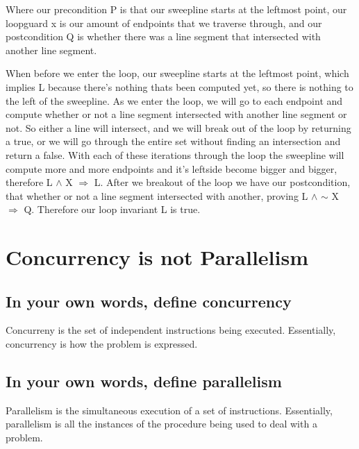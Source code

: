 \documentclass[10pt,a4paper]{article}
\begin{document}
Where our precondition P is that our sweepline starts at the leftmost point, our loopguard x is our amount of endpoints that we traverse through, and our postcondition Q is whether there was a line segment that intersected with another line segment.

When before we enter the loop, our sweepline starts at the leftmost point, which implies L because there's nothing thats been computed yet, so there is nothing to the left of the sweepline. As we enter the loop, we will go to each endpoint and compute whether or not a line segment intersected with another line segment or not. So either a line will intersect, and we will break out of the loop by returning a true, or we will go through the entire set without finding an intersection and return a false. With each of these iterations through the loop the sweepline will compute more and more endpoints and it's leftside become bigger and bigger, therefore 
L $\wedge$ X $\Rightarrow$ L. After we breakout of the loop we have our postcondition, that whether or not a line segment intersected with another, proving L $\wedge$ $\sim$ X $\Rightarrow$ Q. Therefore our loop invariant L is true.

\section{Concurrency is not Parallelism}
\subsection{In your own words, define concurrency}
Concurreny is the set of independent instructions being executed. Essentially, concurrency is how the problem is expressed.
\subsection{In your own words, define parallelism}
Parallelism is the simultaneous execution of a set of instructions. Essentially, parallelism is all the instances of the procedure being used to deal with a problem.
\end{document}
